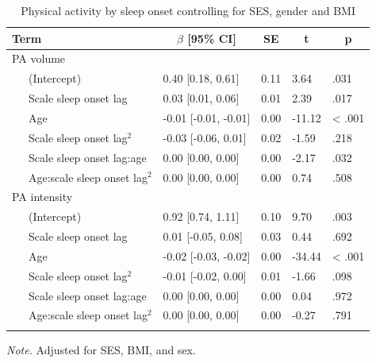 \documentclass[
  man]{apa6}
\begin{document}
\begin{table}[tbp]

\begin{center}
\begin{threeparttable}

\caption{\label{tab:PA-by-sleep-onset}Physical activity by sleep onset controlling for SES, gender and BMI}

\begin{tabular}{lllll}
\toprule
Term & \multicolumn{1}{c}{$\beta$ [95\% CI]} & \multicolumn{1}{c}{SE} & \multicolumn{1}{c}{t} & \multicolumn{1}{c}{p}\\
\midrule
PA volume &  &  &  & \\
\ \ \ (Intercept) & 0.40 [0.18, 0.61] & 0.11 & 3.64 & .031\\
\ \ \ Scale sleep onset lag & 0.03 [0.01, 0.06] & 0.01 & 2.39 & .017\\
\ \ \ Age & -0.01 [-0.01, -0.01] & 0.00 & -11.12 & < .001\\
\ \ \ Scale sleep onset lag$^2$ & -0.03 [-0.06, 0.01] & 0.02 & -1.59 & .218\\
\ \ \ Scale sleep onset lag:age & 0.00 [0.00, 0.00] & 0.00 & -2.17 & .032\\
\ \ \ Age:scale sleep onset lag$^2$ & 0.00 [0.00, 0.00] & 0.00 & 0.74 & .508\\
PA intensity &  &  &  & \\
\ \ \ (Intercept) & 0.92 [0.74, 1.11] & 0.10 & 9.70 & .003\\
\ \ \ Scale sleep onset lag & 0.01 [-0.05, 0.08] & 0.03 & 0.44 & .692\\
\ \ \ Age & -0.02 [-0.03, -0.02] & 0.00 & -34.44 & < .001\\
\ \ \ Scale sleep onset lag$^2$ & -0.01 [-0.02, 0.00] & 0.01 & -1.66 & .098\\
\ \ \ Scale sleep onset lag:age & 0.00 [0.00, 0.00] & 0.00 & 0.04 & .972\\
\ \ \ Age:scale sleep onset lag$^2$ & 0.00 [0.00, 0.00] & 0.00 & -0.27 & .791\\
\bottomrule
\addlinespace
\end{tabular}

\begin{tablenotes}[para]
\normalsize{\textit{Note.} Adjusted for SES, BMI, and sex. }
\end{tablenotes}

\end{threeparttable}
\end{center}

\end{table}
\end{document}
